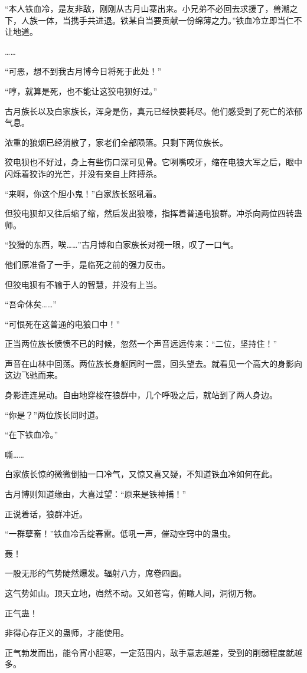 \begin{this_body}
“本人铁血冷，是友非敌，刚刚从古月山寨出来。小兄弟不必回去求援了，兽潮之下，人族一体，当携手共进退。铁某自当要贡献一份绵薄之力。”铁血冷立即当仁不让地道。

……

“可恶，想不到我古月博今日将死于此处！”

“哼，就算是死，也不能让这狡电狈好过。”

古月族长以及白家族长，浑身是伤，真元已经快要耗尽。他们感受到了死亡的浓郁气息。

浓重的狼烟已经消散了，家老们全部陨落。只剩下两位族长。

狡电狈也不好过，身上有些伤口深可见骨。它咧嘴咬牙，缩在电狼大军之后，眼中闪烁着狡诈的光芒，并没有亲自上阵搏杀。

“来啊，你这个胆小鬼！”白家族长怒吼着。

但狡电狈却又往后缩了缩，然后发出狼嚎，指挥着普通电狼群。冲杀向两位四转蛊师。

“狡猾的东西，唉……”古月博和白家族长对视一眼，叹了一口气。

他们原准备了一手，是临死之前的强力反击。

但狡电狈有不输于人的智慧，并没有上当。

“吾命休矣……”

“可恨死在这普通的电狼口中！”

正当两位族长愤愤不已的时候，忽然一个声音远远传来：“二位，坚持住！”

声音在山林中回荡。两位族长身躯同时一震，回头望去。就看见一个高大的身影向这边飞驰而来。

身影连连晃动。自由地穿梭在狼群中，几个呼吸之后，就站到了两人身边。

“你是？”两位族长同时道。

“在下铁血冷。”

嘶……

白家族长惊的微微倒抽一口冷气，又惊又喜又疑，不知道铁血冷如何在此。

古月博则知道缘由，大喜过望：“原来是铁神捕！”

正说着话，狼群冲近。

“一群孽畜！”铁血冷舌绽春雷。低吼一声，催动空窍中的蛊虫。

轰！

一股无形的气势陡然爆发。辐射八方，席卷四面。

这气势如山。顶天立地，岿然不动。又如苍穹，俯瞰人间，洞彻万物。

正气蛊！

非得心存正义的蛊师，才能使用。

正气勃发而出，能令宵小胆寒，一定范围内，敌手意志越差，受到的削弱程度就越多。


\end{this_body}
